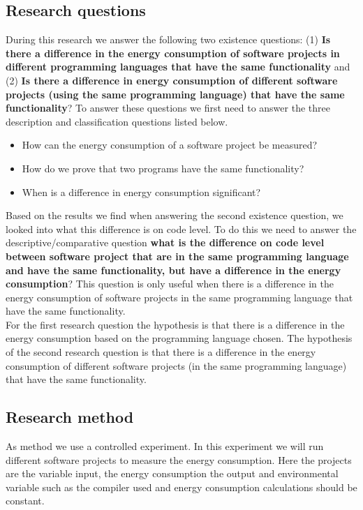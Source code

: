 \subsection{Research questions}
During this research we answer the following two existence questions: (1) \textbf{Is there a difference in the energy consumption of software projects in different programming languages that have the same functionality} and (2) \textbf{Is there a difference in energy consumption of different software projects (using the same programming language) that have the same functionality}? To answer these questions we first need to answer the three description and classification questions listed below.
\begin{itemize}
    \item How can the energy consumption of a software project be measured?
    \item How do we prove that two programs have the same functionality?
    \item When is a difference in energy consumption significant?\\
\end{itemize}

Based on the results we find when answering the second existence question, we looked into what this difference is on code level. To do this we need to answer the descriptive/comparative question \textbf{what is the difference on code level between software project that are in the same programming language and have the same functionality, but have a difference in the energy consumption}? This question is only useful when there is a difference in the energy consumption of software projects in the same programming language that have the same functionality. \\

For the first research question the hypothesis is that there is a difference in the energy consumption based on the programming language chosen. The hypothesis of the second research question is that there is a difference in the energy consumption of different software projects (in the same programming language) that have the same functionality.

\subsection{Research method}
As method we use a controlled experiment. In this experiment we will run different software projects to measure the energy consumption. Here the projects are the variable input, the energy consumption the output and environmental variable such as the compiler used and energy consumption calculations should be constant.

